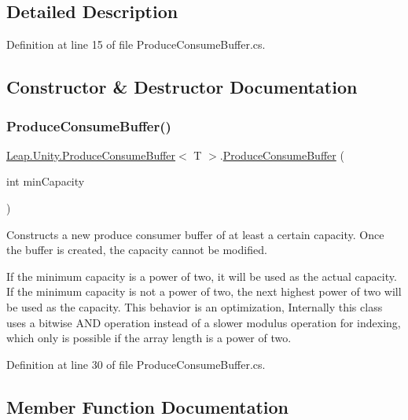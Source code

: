 \subsection{Detailed Description}


Definition at line 15 of file Produce\+Consume\+Buffer.\+cs.



\subsection{Constructor \& Destructor Documentation}
\mbox{\label{class_leap_1_1_unity_1_1_produce_consume_buffer_abb2dd45e9fdf9542e1392a16b5a19a9e}} 
\subsubsection{\texorpdfstring{ProduceConsumeBuffer()}{ProduceConsumeBuffer()}}
{\footnotesize\ttfamily \mbox{\hyperlink{class_leap_1_1_unity_1_1_produce_consume_buffer}{Leap.\+Unity.\+Produce\+Consume\+Buffer}}$<$ T $>$.\mbox{\hyperlink{class_leap_1_1_unity_1_1_produce_consume_buffer}{Produce\+Consume\+Buffer}} (\begin{DoxyParamCaption}\item[{int}]{min\+Capacity }\end{DoxyParamCaption})}



Constructs a new produce consumer buffer of at least a certain capacity. Once the buffer is created, the capacity cannot be modified. 

If the minimum capacity is a power of two, it will be used as the actual capacity. If the minimum capacity is not a power of two, the next highest power of two will be used as the capacity. This behavior is an optimization, Internally this class uses a bitwise A\+ND operation instead of a slower modulus operation for indexing, which only is possible if the array length is a power of two. 

Definition at line 30 of file Produce\+Consume\+Buffer.\+cs.



\subsection{Member Function Documentation}
\mbox{\label{class_leap_1_1_unity_1_1_produce_consume_buffer_a8974fa947fcc940620300c54d3de6f1b}} 
